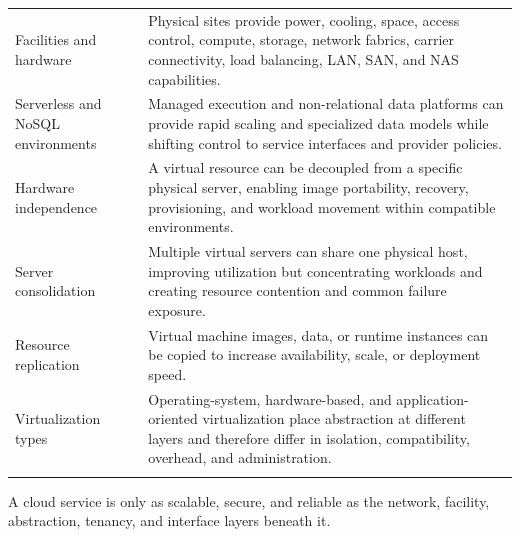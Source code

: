 \documentclass[11pt]{article}
\begin{document}
\begin{longtable}{@{}>{\RaggedRight\arraybackslash}p{}>{\RaggedRight\arraybackslash}p{}@{}}
Facilities and hardware & Physical sites provide power, cooling, space, access control, compute, storage, network fabrics, carrier connectivity, load balancing, LAN, SAN, and NAS capabilities. \\\addlinespace[2pt]
Serverless and NoSQL environments & Managed execution and non-relational data platforms can provide rapid scaling and specialized data models while shifting control to service interfaces and provider policies. \\\addlinespace[2pt]
Hardware independence & A virtual resource can be decoupled from a specific physical server, enabling image portability, recovery, provisioning, and workload movement within compatible environments. \\\addlinespace[2pt]
Server consolidation & Multiple virtual servers can share one physical host, improving utilization but concentrating workloads and creating resource contention and common failure exposure. \\\addlinespace[2pt]
Resource replication & Virtual machine images, data, or runtime instances can be copied to increase availability, scale, or deployment speed. \\\addlinespace[2pt]
Virtualization types & Operating-system, hardware-based, and application-oriented virtualization place abstraction at different layers and therefore differ in isolation, compatibility, overhead, and administration. \\\addlinespace[2pt]
\bottomrule
\end{longtable}
\begin{takeawaybox}
A cloud service is only as scalable, secure, and reliable as the network, facility, abstraction, tenancy, and interface layers beneath it.
\end{takeawaybox}
\end{document}
